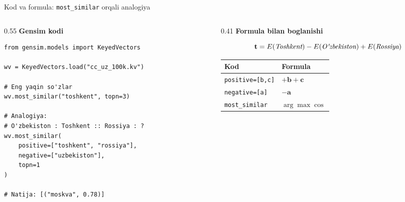 \documentclass[aspectratio=169,11pt]{beamer}
\begin{document}
\begin{frame}[fragile]{Kod va formula: \texttt{most\_similar} orqali analogiya}
\scriptsize

\begin{columns}[T,totalwidth=\textwidth]
\begin{column}{0.55\textwidth}
\textbf{Gensim kodi}

\vspace{2pt}
\begin{tcolorbox}[defbox,left=2mm,right=2mm,top=1mm,bottom=1mm]
\begin{verbatim}
from gensim.models import KeyedVectors

wv = KeyedVectors.load("cc_uz_100k.kv")

# Eng yaqin so'zlar
wv.most_similar("toshkent", topn=3)

# Analogiya:
# O'zbekiston : Toshkent :: Rossiya : ?
wv.most_similar(
    positive=["toshkent", "rossiya"],
    negative=["uzbekiston"],
    topn=1
)

# Natija: [("moskva", 0.78)]
\end{verbatim}
\end{tcolorbox}
\end{column}

\begin{column}{0.41\textwidth}
\textbf{Formula bilan bog\textquotesingle{}lanishi}

\vspace{4pt}

\[
\mathbf{t}
=
E(\textit{Toshkent})
-
E(\textit{O\textquotesingle{}zbekiston})
+
E(\textit{Rossiya})
\]

\vspace{3pt}

\begin{center}
\begin{tabular}{@{}l l@{}}
\toprule
\textbf{Kod} & \textbf{Formula} \\
\midrule
\texttt{positive=[b,c]} & $+\mathbf{b}+\mathbf{c}$ \\
\texttt{negative=[a]} & $-\mathbf{a}$ \\
\texttt{most\_similar} & $\arg\max \cos$ \\
\bottomrule
\end{tabular}
\end{center}


\end{column}
\end{columns}
\end{frame}
\end{document}
